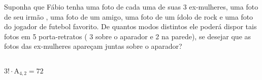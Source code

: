 \begin{ex}
Suponha que Fábio tenha uma foto de cada uma de suas 3 ex-mulheres, uma foto de seu irmão , uma foto de um amigo, uma foto de um ídolo de rock e uma foto do jogador de futebol favorito. De quantos modos distintos ele poderá dispor tais fotos em 5 porta-retratos ( 3 sobre o aparador e 2 na parede), se desejar que as fotos das ex-mulheres apareçam juntas sobre o aparador?
  \begin{sol}
    \phantom{A}\\
    $3!\cdot\mathrm{A}_{4,2}=72$
  \end{sol}
\end{ex}